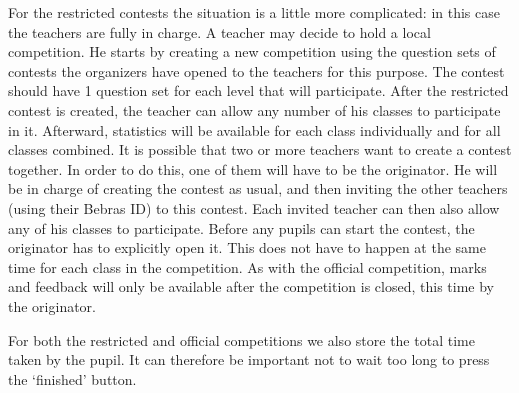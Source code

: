 For the restricted contests the situation is a little more complicated: in this case the teachers are fully 
in charge. A teacher may decide to hold a local competition. He starts by creating a new competition using 
the question sets of contests the organizers have opened to the teachers for this purpose. The contest 
should have 1 question set for each level that will participate. After the restricted contest is created, 
the teacher can allow any number of his classes to participate in it. Afterward, statistics will be 
available for each class individually and for all classes combined. It is possible that two or more teachers 
want to create a contest together. In order to do this, one of them will have to be the originator. He will 
be in charge of creating the contest as usual, and then inviting the other teachers (using their Bebras ID) 
to this contest. Each invited teacher can then also allow any of his classes to participate. Before any 
pupils can start the contest, the originator has to explicitly open it. This does not have to happen at the 
same time for each class in the competition. As with the official competition, marks and feedback will only 
be available after the competition is closed, this time by the originator.

For both the restricted and official competitions we also store the total time taken by the pupil. It can 
therefore be important not to wait too long to press the `finished' button.     
